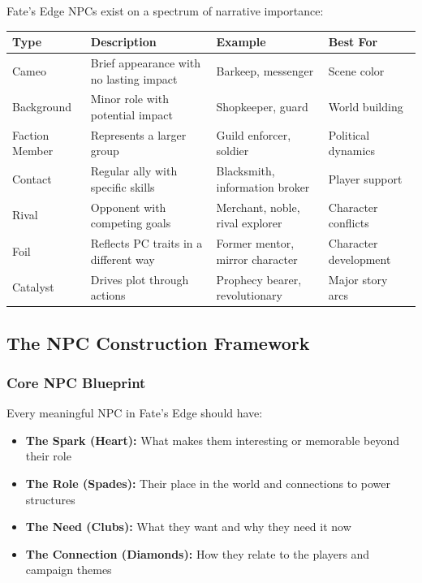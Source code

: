 Fate's Edge NPCs exist on a spectrum of narrative importance:

\begin{center}
\begin{tabular}{|p{}|p{}|p{}|p{}|}
\hline
\textbf{Type} & \textbf{Description} & \textbf{Example} & \textbf{Best For} \\ \hline
Cameo & Brief appearance with no lasting impact & Barkeep, messenger & Scene color \\ \hline
Background & Minor role with potential impact & Shopkeeper, guard & World building \\ \hline
Faction Member & Represents a larger group & Guild enforcer, soldier & Political dynamics \\ \hline
Contact & Regular ally with specific skills & Blacksmith, information broker & Player support \\ \hline
Rival & Opponent with competing goals & Merchant, noble, rival explorer & Character conflicts \\ \hline
Foil & Reflects PC traits in a different way & Former mentor, mirror character & Character development \\ \hline
Catalyst & Drives plot through actions & Prophecy bearer, revolutionary & Major story arcs \\ \hline
\end{tabular}
\end{center}

\subsection{The NPC Construction Framework}

\subsubsection{Core NPC Blueprint}

Every meaningful NPC in Fate's Edge should have:

\begin{itemize}
  \item \textbf{The Spark (Heart):} What makes them interesting or memorable beyond their role
  \item \textbf{The Role (Spades):} Their place in the world and connections to power structures
  \item \textbf{The Need (Clubs):} What they want and why they need it now
  \item \textbf{The Connection (Diamonds):} How they relate to the players and campaign themes
\end{itemize}


